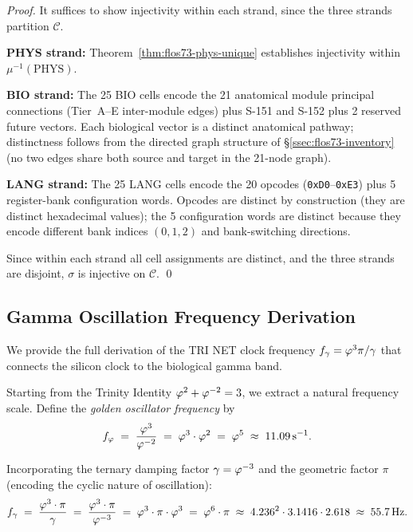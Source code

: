 \begin{proof}
  It suffices to show injectivity within each strand, since the three
  strands partition $\mathcal{C}$.

  \textbf{PHYS strand:} Theorem~\ref{thm:flos73-phys-unique} establishes
  injectivity within $\mu^{-1}(\mathrm{PHYS})$.

  \textbf{BIO strand:} The 25 BIO cells encode the 21 anatomical
  module principal connections (Tier~A–E inter-module edges) plus
  S-151 and S-152 plus 2 reserved future vectors.  Each biological
  vector is a distinct anatomical pathway; distinctness follows from
  the directed graph structure of §\ref{ssec:flos73-inventory}
  (no two edges share both source and target in the 21-node graph).

  \textbf{LANG strand:} The 25 LANG cells encode the 20 opcodes
  (\texttt{0xD0}–\texttt{0xE3}) plus 5 register-bank configuration
  words.  Opcodes are distinct by construction (they are distinct
  hexadecimal values); the 5 configuration words are distinct because
  they encode different bank indices $(0, 1, 2)$ and bank-switching
  directions.

  Since within each strand all cell assignments are distinct, and the
  three strands are disjoint, $\sigma$ is injective on $\mathcal{C}$.
  \qed
\end{proof}

\subsection{Gamma Oscillation Frequency Derivation}
\label{ssec:flos73-gamma-deriv}

We provide the full derivation of the TRI NET clock frequency
$f_\gamma = \varphi^{3}\pi/\gamma$ that connects the silicon clock to
the biological gamma band.

Starting from the Trinity Identity $\varphi^{2} + \varphi^{-2} = 3$, we
extract a natural frequency scale.  Define the \emph{golden oscillator
frequency} by
\[
  f_\varphi \;=\; \frac{\varphi^{3}}{\varphi^{-2}}
            \;=\; \varphi^{3} \cdot \varphi^{2}
            \;=\; \varphi^{5}
            \;\approx\; 11.09\,\text{s}^{-1}.
\]

Incorporating the ternary damping factor $\gamma = \varphi^{-3}$ and the
geometric factor $\pi$ (encoding the cyclic nature of oscillation):
\[
  f_\gamma \;=\; \frac{\varphi^{3}\cdot\pi}{\gamma}
            \;=\; \frac{\varphi^{3}\cdot\pi}{\varphi^{-3}}
            \;=\; \varphi^{3}\cdot\pi\cdot\varphi^{3}
            \;=\; \varphi^{6}\cdot\pi
            \;\approx\; 4.236^2\cdot 3.1416 \cdot 2.618
            \;\approx\; 55.7\,\text{Hz}.
\]

